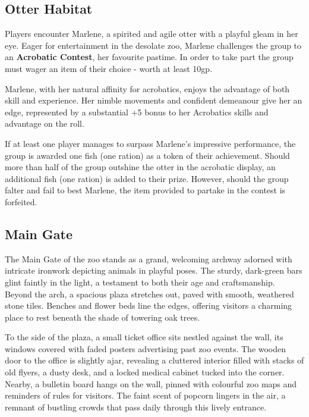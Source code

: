 \subsection*{ Otter Habitat}
{\entryfont Players encounter Marlene, a spirited and agile otter with a playful gleam in her eye. Eager for entertainment in the desolate zoo, Marlene challenges the group to an \textbf{Acrobatic Contest}, her favourite pastime. In order to take part the group must wager an item of their choice - worth at least 10gp. 

Marlene, with her natural affinity for acrobatics, enjoys the advantage of both skill and experience. Her nimble movements and confident demeanour give her an edge, represented by a substantial +5 bonus to her Acrobatics skills and advantage on the roll.

If at least one player manages to surpass Marlene's impressive performance, the group is awarded one fish (one ration) as a token of their achievement. Should more than half of the group outshine the otter in the acrobatic display, an additional fish (one ration) is added to their prize. However, should the group falter and fail to best Marlene, the item provided to partake in the contest is forfeited.}

\subsection*{ Main Gate}
\begin{DndReadAloud}
	The Main Gate of the zoo stands as a grand, welcoming archway adorned with intricate ironwork depicting animals in playful poses. The sturdy, dark-green bars glint faintly in the light, a testament to both their age and craftsmanship. Beyond the arch, a spacious plaza stretches out, paved with smooth, weathered stone tiles. Benches and flower beds line the edges, offering visitors a charming place to rest beneath the shade of towering oak trees.

	To the side of the plaza, a small ticket office sits nestled against the wall, its windows covered with faded posters advertising past zoo events. The wooden door to the office is slightly ajar, revealing a cluttered interior filled with stacks of old flyers, a dusty desk, and a locked medical cabinet tucked into the corner. Nearby, a bulletin board hangs on the wall, pinned with colourful zoo maps and reminders of rules for visitors. The faint scent of popcorn lingers in the air, a remnant of bustling crowds that pass daily through this lively entrance.
\end{DndReadAloud}

